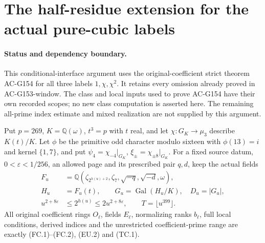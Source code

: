 \section{The half-residue extension for the actual pure-cubic labels}
\label{sec:pure-cubic-half-window}

\paragraph{Status and dependency boundary.}
This conditional-interface argument uses the original-coefficient
strict theorem AC-G154 for all three labels $1,\chi,\chi^2$.
It retains every omission already proved in AC-G153-window.
The class and local inputs used to prove AC-G154 have their own
recorded scopes; no new class computation is asserted here.
The remaining all-prime index estimate and mixed realization
are not supplied by this argument.

Put $p=269$, $K=\mathbb Q(\omega)$, $t^3=p$ with $t$ real,
and let $\chi:G_K\to\mu_3$ describe $K(t)/K$.
Let $\phi$ be the primitive odd character modulo sixteen with
$\phi(13)=i$ and kernel $\{1,7\}$, and put
$\psi_4=\chi_{-4}|_{G_K}$, $\xi_\pm=\chi_{\pm8}|_{G_K}$.
For a fixed source datum, $0<\varepsilon<1/256$, an allowed
page and its prescribed pair $q,d$, keep the actual fields
\[
 \begin{aligned}
 F_u&=\mathbb Q(\zeta_{2^{h(u)+2}},\zeta_7,
                           \sqrt{-q},\sqrt{-d},\omega),\\
 H_u&=F_u(t),\qquad G_u=\operatorname{Gal}(H_u/K),\quad D_u=|G_u|,\\
 u^{2+8\varepsilon}&\leq2^{h(u)}\leq2u^{2+8\varepsilon},
                      \qquad T=\lfloor u^{399}\rfloor.
 \end{aligned}
 \tag{PCW.1}
\]
All original coefficient rings $O_\ell$, fields $E_\ell$,
normalizing ranks $b_\ell$, full local conditions, derived
indices and the unrestricted coefficient-prime range are
exactly (FC.1)--(FC.2), (EU.2) and (TC.1).

